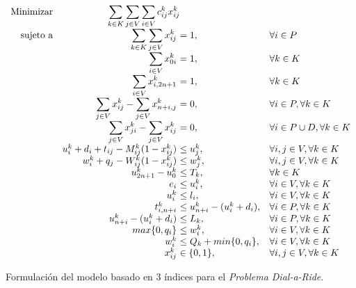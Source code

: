 \documentclass{subfiles}
\begin{document}
      \begin{eqfloat}
				\begin{equation}
					\begin{array}{rr@{}ll}
  					\text{Minimizar}
              & \displaystyle\sum\limits_{k \in K}\sum\limits_{j \in V}\sum\limits_{i \in V}  c_{ij}^{k}x_{ij}^{k} &
                & \\
						\text{sujeto a}
              & \displaystyle\sum\limits_{k \in K}\sum\limits_{j \in V} x_{ij}^{k} \ &= 1,
                & \forall i \in P \\
              & \displaystyle\sum\limits_{i \in V} x_{0i}^{k}  \ &= 1,
                & \forall k \in K \\
              & \displaystyle\sum\limits_{i \in V} x_{i,2n+1}^{k}  \ &= 1,
                & \forall k \in K \\
              & \displaystyle\sum\limits_{j \in V} x_{ij}^{k} - \sum\limits_{j \in V} x_{n+i,j}^{k} \ &= 0,
                & \forall i \in P, \forall k \in K \\
              & \displaystyle\sum\limits_{j \in V} x_{ji}^{k} - \sum\limits_{j \in V} x_{ij}^{k} \ &= 0,
                & \forall i \in P \cup D, \forall k \in K \\
              & u_{i}^{k} + d_{i} + t_{ij} - M_{ij}^k (1 - x_{ij}^k) \ &\leq u_{j}^{k},
                & \forall i,j \in V, \forall k \in K \\
              & w_{i}^{k} + q_{j} - W_{ij}^k (1 - x_{ij}^k) \ &\leq w_{j}^{k},
                & \forall i,j \in V, \forall k \in K \\
              & u_{2n+1}^{k} - u_{0}^{k} \ &\leq T_{k},
                & \forall k \in K \\
              & e_{i} \ &\leq u_{i}^{k},
                & \forall i \in V, \forall k \in K \\
              & u_{i}^{k} \ &\leq l_{i},
                & \forall i \in V, \forall k \in K \\
              & t_{i, n + i}^{k} \ &\leq u_{n+i}^{k} - (u_{i}^{k} + d_{i}),
                & \forall i \in P, \forall k \in K \\
              & u_{n+i}^{k} - (u_{i}^{k} + d_{i}) \ &\leq L_{k},
                & \forall i \in P, \forall k \in K \\
              & max\{0, q_{i}\} \ &\leq w_{i}^{k},
                & \forall i \in V, \forall k \in K \\
              & w_{i}^{k} \ &\leq Q_{k} + min\{0, q_{i}\},
                & \forall i \in V, \forall k \in K \\
							& x_{ij}^k \ &\in \{0,1\},
                & \forall i,j \in V, \forall k \in K \\
					\end{array}
				\end{equation}
				\caption{Formulación del modelo basado en $3$ índices para el \emph{Problema Dial-a-Ride}.}
				\label{eq:formulation_basic_darp}
			\end{eqfloat}
\end{document}
